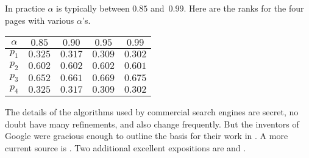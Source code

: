 In practice $\alpha$ is typically between $0.85$ and~$0.99$.
Here are the ranks for the four pages with various
$\alpha$'s.
\begin{center}
  \begin{tabular}{r|cccc}
    \multicolumn{1}{c}{$\alpha$}
          &$0.85$  &$0.90$  &$0.95$ &$0.99$ \\ \hline
    $p_1$ &$0.325$ &$0.317$ &$0.309$  &$0.302$  \\
    $p_2$ &$0.602$ &$0.602$ &$0.602$  &$0.601$  \\
    $p_3$ &$0.652$ &$0.661$ &$0.669$  &$0.675$  \\
    $p_4$ &$0.325$ &$0.317$ &$0.309$  &$0.302$  
  \end{tabular}
\end{center}


\medskip
The details of the algorithms used by commercial search engines are 
secret, no doubt have many refinements, and also change frequently.
But the inventors of Google were gracious enough to outline the basis for 
their work in \cite{BrinPage}.
A more current source is \cite{WikipediaPageRank}.
Two additional excellent expositions are 
\cite{Wills} and
\cite{Austin}.


